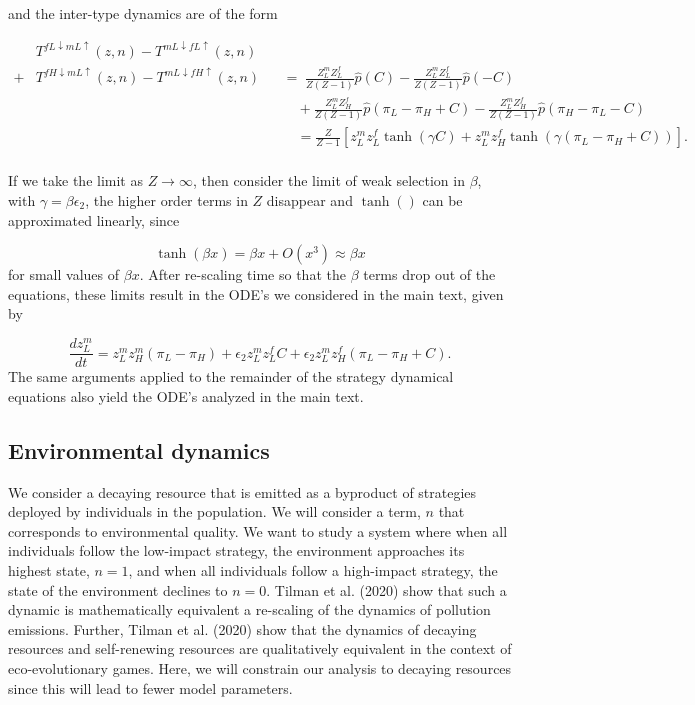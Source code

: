 \documentclass{article}
\begin{document}
and the inter-type dynamics are of the form

\begin{align}
    &T^{fL\downarrow mL\uparrow}(z,n) - T^{mL\downarrow fL\uparrow}(z,n)&&\\\nonumber
    +&T^{fH\downarrow mL\uparrow}(z,n) - T^{mL\downarrow fH\uparrow}(z,n)&&
        =\;\frac{Z^m_L Z^f_L}{Z(Z-1)} \hat p(C) - \frac{Z^m_L Z^f_L}{Z(Z-1)} \hat p(-C)\\\nonumber
        &&&\quad+ \frac{Z^m_L Z^f_H}{Z(Z-1)} \hat p(\pi_L-\pi_H+C) - \frac{Z^m_L Z^f_H}{Z(Z-1)}  \hat p(\pi_H-\pi_L-C)\\\nonumber
        &&&\quad= \frac{Z}{Z-1}\left[  z^m_L z^f_L \tanh{\left(\gamma C\right)}  + z^m_L z^f_H  \tanh{\left(\gamma\left(\pi_L - \pi_H + C\right)\right)} \right]. \\\nonumber
\end{align}

If we take the limit as $Z\to\infty$, then consider the limit of weak selection in $\beta$, with $\gamma = \beta\epsilon_2$,  the higher order terms in $Z$ disappear and $\tanh()$ can be approximated linearly, since 

\begin{equation}
    \tanh{(\beta x)} = \beta x + O(x^3) \approx \beta x 
\end{equation}
for small values of $\beta x$.
After re-scaling time so that the $\beta$ terms drop out of the equations, these limits result in the ODE's we considered in the main text, given by 

\begin{equation}
    \frac{d z^m_L}{dt} = z_L^m z_H^m \left(\pi_L-\pi_H\right) + \epsilon_2 z_L^m z_L^f C + \epsilon_2 z_L^m z_H^f \left(\pi_L-\pi_H+C\right). 
\end{equation}
The same arguments applied to the remainder of the strategy dynamical equations also yield the ODE's analyzed in the main text.
\subsection{Environmental dynamics}
We consider a decaying resource that is emitted as a byproduct of strategies deployed by individuals in the population. We will consider a term, $n$ that corresponds to environmental quality. We want to study a system where when all individuals follow the low-impact strategy, the environment approaches its highest state, $n=1$, and when all individuals follow a high-impact strategy, the state of the environment declines to $n=0$. Tilman et al. (2020) show that such a dynamic is mathematically equivalent a re-scaling of the dynamics of pollution emissions. Further, Tilman et al. (2020) show that the dynamics of decaying resources and self-renewing resources are qualitatively equivalent in the context of eco-evolutionary games. Here, we will constrain our analysis to decaying resources since this will lead to fewer model parameters. 
\end{document}
